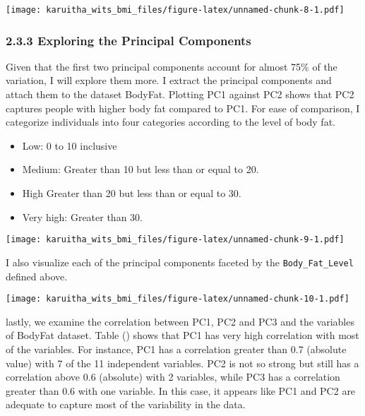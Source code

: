 \documentclass[
]{article}
\begin{document}
\texttt{[image: karuitha\_wits\_bmi\_files/figure-latex/unnamed-chunk-8-1.pdf]}

\hypertarget{exploring-the-principal-components}{%
\subsubsection{\texorpdfstring{\textbf{2.3.3 Exploring the Principal
Components}}{2.3.3 Exploring the Principal Components}}\label{exploring-the-principal-components}}

Given that the first two principal components account for almost 75\% of
the variation, I will explore them more. I extract the principal
components and attach them to the dataset BodyFat. Plotting PC1 against
PC2 shows that PC2 captures people with higher body fat compared to PC1.
For ease of comparison, I categorize individuals into four categories
according to the level of body fat.

\begin{itemize}
\item
  Low: 0 to 10 inclusive
\item
  Medium: Greater than 10 but less than or equal to 20.
\item
  High Greater than 20 but less than or equal to 30.
\item
  Very high: Greater than 30.
\end{itemize}

\begin{landscape}

\texttt{[image: karuitha\_wits\_bmi\_files/figure-latex/unnamed-chunk-9-1.pdf]}

\end{landscape}

I also visualize each of the principal components faceted by the
\texttt{Body\_Fat\_Level} defined above.

\begin{landscape}

\texttt{[image: karuitha\_wits\_bmi\_files/figure-latex/unnamed-chunk-10-1.pdf]}

\end{landscape}

lastly, we examine the correlation between PC1, PC2 and PC3 and the
variables of BodyFat dataset. Table () shows that PC1 has very high
correlation with most of the variables. For instance, PC1 has a
correlation greater than 0.7 (absolute value) with 7 of the 11
independent variables. PC2 is not so strong but still has a correlation
above 0.6 (absolute) with 2 variables, while PC3 has a correlation
greater than 0.6 with one variable. In this case, it appears like PC1
and PC2 are adequate to capture most of the variability in the data.
\end{document}
